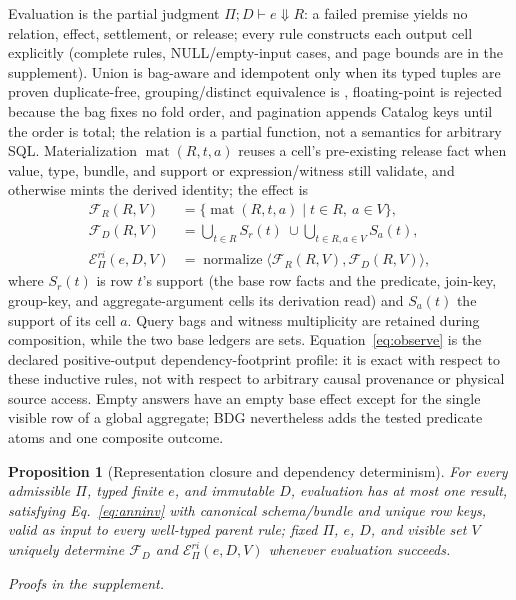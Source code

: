 \documentclass[10pt,journal,compsoc]{IEEEtran}
\newcommand{\code}[1]{\texttt{\detokenize{#1}}}
\newcommand{\facts}{\mathcal{F}}
\newcommand{\rieffect}{\mathcal{E}^{ri}}
\newtheorem{proposition}{Proposition}
\begin{document}
Evaluation is the partial judgment $\Pi;D\vdash e\Downarrow R$: a failed
premise yields no relation, effect, settlement, or release; every rule
constructs each output cell explicitly (complete rules, NULL/empty-input
cases, and page bounds are in the supplement). Union is bag-aware and idempotent only when its typed tuples are proven
duplicate-free, grouping/distinct equivalence is \code{IS NOT DISTINCT FROM},
floating-point \code{SUM} is rejected because the bag fixes no fold order,
and pagination appends Catalog keys until the order is total; the relation is
a partial function, not a semantics for arbitrary SQL.
Materialization $\operatorname{mat}(R,t,a)$ reuses a cell's pre-existing
release fact when value, type, bundle, and support or expression/witness
still validate, and otherwise mints the derived identity; the effect is
\begin{align}
\facts_R(R,V)&=\{\operatorname{mat}(R,t,a)\mid t\in R,\ a\in V\},\\
\facts_D(R,V)&=\bigcup_{t\in R}S_r(t)\ \cup
                \bigcup_{t\in R,a\in V}S_a(t),\\
\rieffect_\Pi(e,D,V)&=\operatorname{normalize}
  \langle\facts_R(R,V),\facts_D(R,V)\rangle,       \label{eq:observe}
\end{align}
where $S_r(t)$ is row $t$'s support (the base row facts and the predicate,
join-key, group-key, and aggregate-argument cells its derivation read) and
$S_a(t)$ the support of its cell $a$. Query bags and witness multiplicity
are retained during composition, while the two base ledgers are sets.
Equation~\eqref{eq:observe} is the declared
positive-output dependency-footprint profile: it is exact with respect to these
inductive rules, not with respect to arbitrary causal provenance or physical
source access.  Empty answers have an empty base effect except for the single
visible row of a global aggregate; BDG nevertheless adds the tested predicate
atoms and one composite outcome.

\begin{proposition}[Representation closure and dependency determinism]
\label{thm:representation-closure}
For every admissible $\Pi$, typed finite $e$, and immutable $D$, evaluation
has at most one result, satisfying Eq.~\eqref{eq:anninv} with canonical
schema/bundle and unique row keys, valid as input to every well-typed
parent rule; fixed $\Pi$, $e$, $D$, and visible set $V$ uniquely determine
$\facts_D$ and $\rieffect_\Pi(e,D,V)$ whenever evaluation succeeds.
\end{proposition}
\emph{Proofs in the supplement.}
\end{document}
